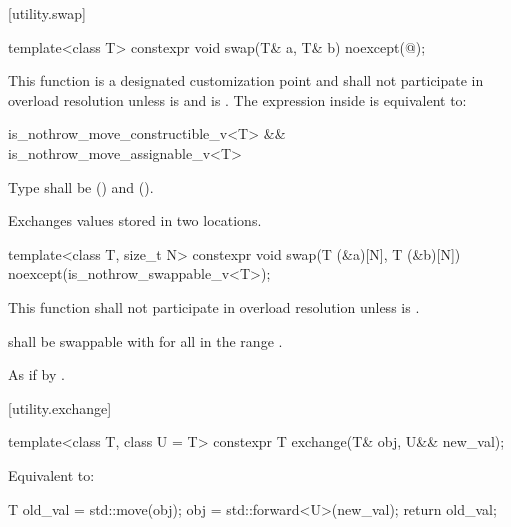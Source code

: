 [utility.swap]{}

%
\begin{itemdecl}
template<class T>
  constexpr void swap(T& a, T& b) noexcept(@\seebelow@);
\end{itemdecl}

\begin{itemdescr}
\pnum
\remarks
This function
is a designated customization point and
shall not participate in overload resolution
unless  is  and
 is .
The expression inside  is equivalent to:

\begin{codeblock}
is_nothrow_move_constructible_v<T> && is_nothrow_move_assignable_v<T>
\end{codeblock}

\pnum
\requires
Type
shall be
 ()
and
 ().

\pnum
\effects
Exchanges values stored in two locations.
\end{itemdescr}

%
\begin{itemdecl}
template<class T, size_t N>
  constexpr void swap(T (&a)[N], T (&b)[N]) noexcept(is_nothrow_swappable_v<T>);
\end{itemdecl}

\begin{itemdescr}
\pnum
\remarks
This function shall not participate in overload resolution
unless  is .

\pnum
\requires
{} shall be swappable with 
for all  in the range .

\pnum
\effects
As if by .
\end{itemdescr}

[utility.exchange]{}

%
\begin{itemdecl}
template<class T, class U = T>
  constexpr T exchange(T& obj, U&& new_val);
\end{itemdecl}

\begin{itemdescr}
\pnum
\effects
Equivalent to:
\begin{codeblock}
T old_val = std::move(obj);
obj = std::forward<U>(new_val);
return old_val;
\end{codeblock}
\end{itemdescr}



